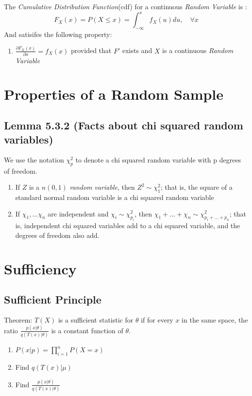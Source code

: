 \documentclass[12pt]{article}
\begin{document}
The \emph{Cumulative Distribution Function}(cdf) for a continuous \emph{Random Variable} is \cite[p.5]{classnotes.4}:
$$F_X(x)=P(X \leq x) = \int_{-\infty}^{x}f_X(u)du, \quad \forall x$$
And satisifes the following property:
\begin{enumerate}
\item $\frac{\partial F_X(x)}{\partial x}=f_X(x)$ provided that $F'$ exists and $X$ is a continuous \emph{Random Variable}
\end{enumerate}

\section*{Properties of a Random Sample}
\subsection*{Lemma 5.3.2 (Facts about chi squared random variables)\cite[p. 219]{StatisticalInference}}
We use the notation $\chi_p^2$ to denote a chi squared random variable with p degrees of freedom. 
\begin{enumerate}
\item If $Z$ is a $n(0, 1)$ \emph{random variable}, then $Z^2\sim\chi_1^2$; that is, the square of a standard normal random variable is a chi squared random variable
\item If $\chi_1,\dots\chi_n$ are independent and $\chi_i\sim\chi_{p_i}^2$, then $\chi_1+\dots+\chi_n\sim\chi_{p_1+\dots+p_n}^2$; that is, independent chi squared variables add to a chi squared variable, and the degrees of freedom also add.
\end{enumerate}

\section*{Sufficiency}
\subsection*{Sufficient Principle \cite[p. 8]{classnotes.14}}
Theorem: $T(X)$ is a sufficient statistic for $\theta$ if for every $x$ in the same space, the ratio $\frac{p(x|\theta)}{q(T(x)|\theta)}$ is a constant function of $\theta$.
\begin{enumerate}
\item $P(x|p)=\prod\limits_{i=1}^nP(X=x)$
\item Find $q(T(x)|\mu)$
\item Find $\frac{p(x|\theta)}{q(T(x)|\theta)}$
\end{enumerate}
\end{document}
